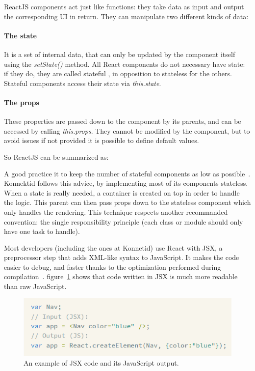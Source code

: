 ReactJS components act just like functions: they take data as input and output the corresponding UI in return. They can manipulate two different kinds of data:
\paragraph{The state} It is a set of internal data, that can only be updated by the component itself using the \textit{setState()}  method. All React components do not necessary have state: if they do, they are called \guillemotleft{} stateful \guillemotright{}, in opposition to \guillemotleft{} stateless \guillemotright{} for the others. Stateful components access their state via \textit{this.state}.

\paragraph{The props} These properties are passed down to the component by its parents, and can be accessed by calling \textit{this.props}. They cannot be modified by the component, but to avoid issues if not provided it is possible to define default values.

So ReactJS can be summarized as: 

A good practice it to keep the number of stateful components as low as possible~\cite{state}. Konnektid follows this advice,
by implementing most of its components stateless. When a state is really needed, a \guillemotleft{} container \guillemotright{}
is created on top in order to handle the logic. This parent can then pass props down to the stateless component which only handles the rendering. This technique respects another recommanded convention: the single responsibility principle (each class or module should only have one task to handle).

Most developers (including the ones at Konnetid) use React with JSX, a preprocessor step that adds XML-like syntax to JavaScript.
It makes the code easier to debug, and faster thanks to the optimization performed during compilation~\cite{whyJsx}. {\sc figure}~\ref{fig:jsx} shows that code written in JSX is much more readable than raw JavaScript.

\begin{figure}[H]
    \centering
    \includegraphics[scale=0.9]{figure/jsx.png}
    \caption{An example of JSX code and its JavaScript output.}
    \label{fig:jsx}
\end{figure}

